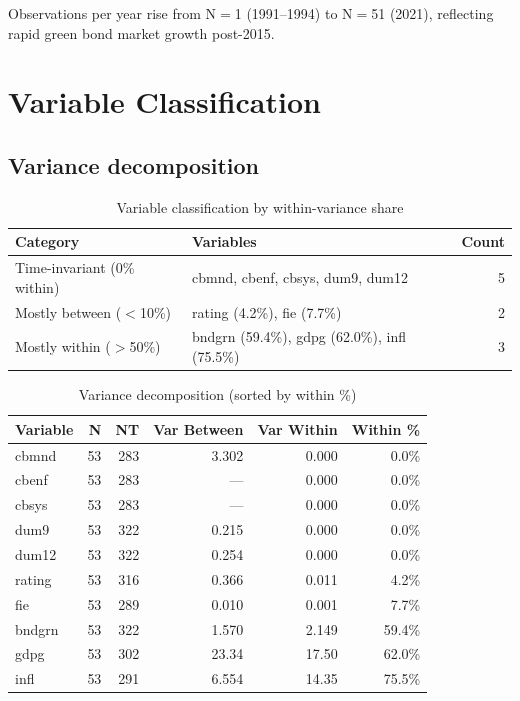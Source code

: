 \documentclass[12pt,a4paper]{article}
\begin{document}
\noindent Observations per year rise from N$=$1 (1991--1994) to N$=$51
(2021), reflecting rapid green bond market growth post-2015.

\section{Variable Classification}

\subsection{Variance decomposition}

\begin{table}[H]
\centering
\caption{Variable classification by within-variance share}
\label{tab:varclass}
\begin{tabular}{llr}
\toprule
Category & Variables & Count \\
\midrule
Time-invariant (0\% within)  & cbmnd, cbenf, cbsys, dum9, dum12 & 5 \\
Mostly between ($<$10\%)     & rating (4.2\%), fie (7.7\%)       & 2 \\
Mostly within ($>$50\%)      & bndgrn (59.4\%), gdpg (62.0\%), infl (75.5\%) & 3 \\
\bottomrule
\end{tabular}
\end{table}

\begin{table}[H]
\centering
\caption{Variance decomposition (sorted by within \%)}
\label{tab:vardec}
\begin{tabular}{lrrrrr}
\toprule
Variable & N & NT & Var Between & Var Within & Within \% \\
\midrule
cbmnd   & 53 & 283 & 3.302 & 0.000 &  0.0\% \\
cbenf   & 53 & 283 & ---   & 0.000 &  0.0\% \\
cbsys   & 53 & 283 & ---   & 0.000 &  0.0\% \\
dum9    & 53 & 322 & 0.215 & 0.000 &  0.0\% \\
dum12   & 53 & 322 & 0.254 & 0.000 &  0.0\% \\
rating  & 53 & 316 & 0.366 & 0.011 &  4.2\% \\
fie     & 53 & 289 & 0.010 & 0.001 &  7.7\% \\
bndgrn  & 53 & 322 & 1.570 & 2.149 & 59.4\% \\
gdpg    & 53 & 302 & 23.34 & 17.50 & 62.0\% \\
infl    & 53 & 291 & 6.554 & 14.35 & 75.5\% \\
\bottomrule
\end{tabular}
\end{table}
\end{document}
